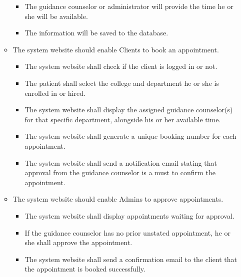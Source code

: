 \begin{enumerate}
\begin{itemize}
			\begin{itemize}
			\item The guidance counselor or administrator will provide the time he or she will be available. 
			\item The information will be saved to the database. 
			\end{itemize}
		\item The system website should enable Clients to book an appointment. 
			\begin{itemize}
			\item The system website shall check if the client is logged in or not. 
			\item The patient shall select the college and department he or she is enrolled in or hired. 
			\item The system website shall display the assigned guidance counselor(s) for that specific department, alongside his or her available time. 
			\item The system website shall generate a unique booking number for each appointment. 
			\item The system website shall send a notification email stating that approval from the guidance counselor is a must to confirm the appointment.  
			\end{itemize}
		\item The system website should enable Admins to approve appointments. 
			\begin{itemize}
			\item The system website shall display appointments waiting for approval. 
			\item If the guidance counselor has no prior unstated appointment, he or she shall approve the appointment. 
			\item The system website shall send a confirmation email to the client that the appointment is booked successfully. 
			\end{itemize}


\end{itemize}
\end{enumerate}
